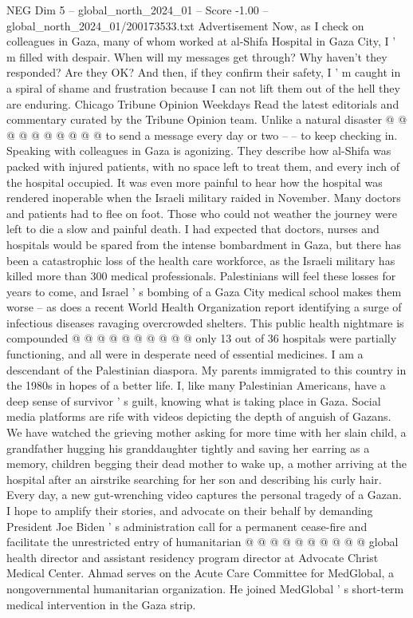 \begin{textsample}{NEG Dim 5 – global\_north\_2024\_01 – Score -1.00 – global\_north\_2024\_01/200173533.txt}
Advertisement Now, as I check on colleagues in Gaza, many of whom worked at al-Shifa Hospital in Gaza City, I ' m filled with despair.
When will my messages get through?
Why haven't they responded?
Are they OK?
And then, if they confirm their safety, I ' m caught in a spiral of shame and frustration because I can not lift them out of the hell they are enduring.
Chicago Tribune Opinion Weekdays Read the latest editorials and commentary curated by the Tribune Opinion team.
Unlike a natural disaster @ @ @ @ @ @ @ @ @ @ to send a message every day or two -- -- to keep checking in.
Speaking with colleagues in Gaza is agonizing.
They describe how al-Shifa was packed with injured patients, with no space left to treat them, and every inch of the hospital occupied.
It was even more painful to hear how the hospital was rendered inoperable when the Israeli military raided in November.
Many doctors and patients had to flee on foot.
Those who could not weather the journey were left to die a slow and painful death.
I had expected that doctors, nurses and hospitals would be spared from the intense bombardment in Gaza, but there has been a catastrophic loss of the health care workforce, as the Israeli military has killed more than 300 medical professionals.
Palestinians will feel these losses for years to come, and Israel ' s bombing of a Gaza City medical school makes them worse -- as does a recent World Health Organization report identifying a surge of infectious diseases ravaging overcrowded shelters.
This public health nightmare is compounded @ @ @ @ @ @ @ @ @ @ only 13 out of 36 hospitals were partially functioning, and all were in desperate need of essential medicines.
I am a descendant of the Palestinian diaspora.
My parents immigrated to this country in the 1980s in hopes of a better life.
I, like many Palestinian Americans, have a deep sense of survivor ' s guilt, knowing what is taking place in Gaza.
Social media platforms are rife with videos depicting the depth of anguish of Gazans.
We have watched the grieving mother asking for more time with her slain child, a grandfather hugging his granddaughter tightly and saving her earring as a memory, children begging their dead mother to wake up, a mother arriving at the hospital after an airstrike searching for her son and describing his curly hair.
Every day, a new gut-wrenching video captures the personal tragedy of a Gazan.
I hope to amplify their stories, and advocate on their behalf by demanding President Joe Biden ' s administration call for a permanent cease-fire and facilitate the unrestricted entry of humanitarian @ @ @ @ @ @ @ @ @ @ global health director and assistant residency program director at Advocate Christ Medical Center.
Ahmad serves on the Acute Care Committee for MedGlobal, a nongovernmental humanitarian organization.
He joined MedGlobal ' s short-term medical intervention in the Gaza strip.

\end{textsample}
